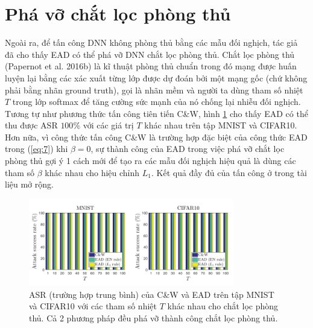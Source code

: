 \section{Phá vỡ chắt lọc phòng thủ}
Ngoài ra, để tấn công DNN không phòng thủ bằng các mẫu đối nghịch, tác giả đã cho thấy EAD có thể phá vỡ DNN chắt lọc phòng thủ. Chắt lọc phòng thủ (Papernot et al. 2016b) là kĩ thuật phòng thủ chuẩn trong đó mạng được huấn luyện lại bằng các xác xuất từng lớp được dự đoán bởi một mạng gốc (chứ không phải bằng nhãn ground truth), gọi là nhãn mềm và người ta dùng tham số nhiệt $T$ trong lớp softmax để tăng cường sức mạnh của nó chống lại nhiễu đối nghịch. Tương tự như phương thức tấn công tiên tiến C\&W, hình \ref{fig:fg_03} cho thấy EAD có thể thu được ASR $100\%$ với các giá trị $T$ khác nhau trên tập MNIST và CIFAR10. Hơn nữa, vì công thức tấn công C\&W là trường hợp đặc biệt của công thức EAD trong (\ref{eq:7}) khi $\beta = 0$, sự thành công của EAD trong việc phá vỡ chắt lọc phòng thủ gợi ý 1 cách mới để tạo ra các mẫu đối nghịch hiệu quả là dùng các tham số  $\beta$ khác nhau cho hiệu chỉnh $L_1$. Kết quả đầy đủ của tấn công ở trong tài liệu mở rộng.

\begin{figure}[H] %
    \centering %
    \includegraphics[width=0.8\textwidth]{assets/fig_3.png} 
    \caption{ASR (trường hợp trung bình) của C\&W và EAD trên tập MNIST và CIFAR10 với các tham số nhiệt $T$ khác nhau cho chắt lọc phòng thủ. Cả 2 phương pháp đều phá vỡ thành công chắt lọc phòng thủ.} %
    \label{fig:fg_03}
\end{figure}